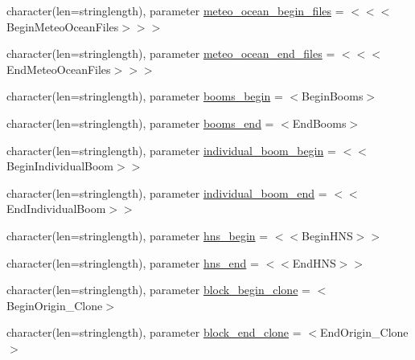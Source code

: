\begin{DoxyCompactItemize}
\item 
character(len=stringlength), parameter \mbox{\hyperlink{namespacemodulelagrangianglobal_a260adf35d65f5de8c2ef2f7210ab46c4}{meteo\+\_\+ocean\+\_\+begin\+\_\+files}} = \textquotesingle{}$<$$<$$<$Begin\+Meteo\+Ocean\+Files$>$$>$$>$\textquotesingle{}
\item 
character(len=stringlength), parameter \mbox{\hyperlink{namespacemodulelagrangianglobal_ac742669b1bfe7c85dbd7b57c2a561692}{meteo\+\_\+ocean\+\_\+end\+\_\+files}} = \textquotesingle{}$<$$<$$<$End\+Meteo\+Ocean\+Files$>$$>$$>$\textquotesingle{}
\item 
character(len=stringlength), parameter \mbox{\hyperlink{namespacemodulelagrangianglobal_a21b026a8bc49b0585775c97d748d3709}{booms\+\_\+begin}} = \textquotesingle{}$<$Begin\+Booms$>$\textquotesingle{}
\item 
character(len=stringlength), parameter \mbox{\hyperlink{namespacemodulelagrangianglobal_a671b64cbbc92e525a648cfe2cb1b8a6e}{booms\+\_\+end}} = \textquotesingle{}$<$End\+Booms$>$\textquotesingle{}
\item 
character(len=stringlength), parameter \mbox{\hyperlink{namespacemodulelagrangianglobal_aaf987cadd3c8ef5f18cd861b433e431e}{individual\+\_\+boom\+\_\+begin}} = \textquotesingle{}$<$$<$Begin\+Individual\+Boom$>$$>$\textquotesingle{}
\item 
character(len=stringlength), parameter \mbox{\hyperlink{namespacemodulelagrangianglobal_aadc9143ff714d0702105bda0be44b172}{individual\+\_\+boom\+\_\+end}} = \textquotesingle{}$<$$<$End\+Individual\+Boom$>$$>$\textquotesingle{}
\item 
character(len=stringlength), parameter \mbox{\hyperlink{namespacemodulelagrangianglobal_ac54c551353c59baecfaba4b43054a9e1}{hns\+\_\+begin}} = \textquotesingle{}$<$$<$Begin\+H\+NS$>$$>$\textquotesingle{}
\item 
character(len=stringlength), parameter \mbox{\hyperlink{namespacemodulelagrangianglobal_aca310c2a391c25bed641705bad337d1b}{hns\+\_\+end}} = \textquotesingle{}$<$$<$End\+H\+NS$>$$>$\textquotesingle{}
\item 
character(len=stringlength), parameter \mbox{\hyperlink{namespacemodulelagrangianglobal_a72d87b3c8689cb2a78e711f2c9d6ad94}{block\+\_\+begin\+\_\+clone}} = \textquotesingle{}$<$Begin\+Origin\+\_\+\+Clone$>$\textquotesingle{}
\item 
character(len=stringlength), parameter \mbox{\hyperlink{namespacemodulelagrangianglobal_a4dac83ce232fc5e2554c9375eb04f52d}{block\+\_\+end\+\_\+clone}} = \textquotesingle{}$<$End\+Origin\+\_\+\+Clone$>$\textquotesingle{}

\end{DoxyCompactItemize}
